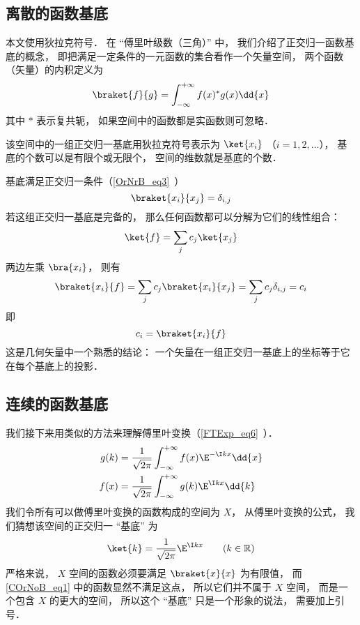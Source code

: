 

\subsection{离散的函数基底}
本文使用狄拉克符号． 在 “傅里叶级数（三角）” 中， 我们介绍了正交归一函数基底的概念， 即把满足一定条件的一元函数的集合看作一个矢量空间， 两个函数（矢量）的内积定义为
\begin{equation}
\braket{f}{g} = \int_{-\infty}^{+\infty} f(x)^* g(x) \dd{x}
\end{equation}
其中 $*$ 表示复共轭， 如果空间中的函数都是实函数则可忽略．

该空间中的一组正交归一基底用狄拉克符号表示为 $\ket{x_i}$ （$i = 1, 2,\dots$）， 基底的个数可以是有限个或无限个， 空间的维数就是基底的个数．

基底满足正交归一条件（\autoref{OrNrB_eq3}~）
\begin{equation}\label{COrNoB_eq2}
\braket{x_i}{x_j} = \delta_{i,j}
\end{equation}
若这组正交归一基底是完备的， 那么任何函数都可以分解为它们的线性组合：
\begin{equation}\label{COrNoB_eq6}
\ket{f} = \sum_j c_j\ket{x_j}
\end{equation}
两边左乘 $\bra{x_i}$， 则有
\begin{equation}
\braket{x_i}{f} = \sum_j c_j\braket{x_i}{x_j} = \sum_j c_j \delta_{i,j} = c_i
\end{equation}
即
\begin{equation}\label{COrNoB_eq5}
c_i = \braket{x_i}{f}
\end{equation}
这是几何矢量中一个熟悉的结论： 一个矢量在一组正交归一基底上的坐标等于它在每个基底上的投影．

\subsection{连续的函数基底}
我们接下来用类似的方法来理解傅里叶变换（\autoref{FTExp_eq6}~）．
\begin{align}\label{COrNoB_eq4}
g(k) &= \frac{1}{\sqrt{2\pi }} \int_{-\infty }^{+\infty } f(x)\E^{-\I kx} \dd{x} \\
\label{COrNoB_eq3}f(x) &= \frac{1}{\sqrt{2\pi }} \int_{-\infty }^{+\infty } g(k)\E^{\I kx} \dd{k}
\end{align}
我们令所有可以做傅里叶变换的函数构成的空间为 $X$， 从傅里叶变换的公式， 我们猜想该空间的正交归一 “基底” 为
\begin{equation}\label{COrNoB_eq1}
\ket{k} = \frac{1}{\sqrt{2\pi}} \E^{\I kx} \qquad (k \in \mathbb R)
\end{equation}
严格来说， $X$ 空间的函数必须要满足 $\braket{x}{x}$ 为有限值， 而\autoref{COrNoB_eq1} 中的函数显然不满足这点， 所以它们并不属于 $X$ 空间， 而是一个包含 $X$ 的更大的空间， 所以这个 “基底” 只是一个形象的说法， 需要加上引号．

